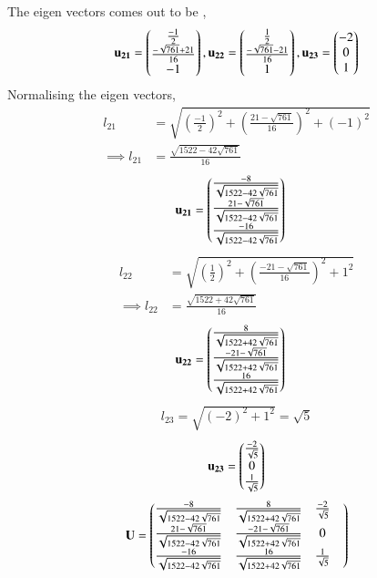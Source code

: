 \documentclass[journal,12pt,twocolumn]{IEEEtran}
\begin{document}
The eigen vectors comes out to be , 
\begin{align}
    \mathbf{u_{21}}=\begin{pmatrix}\frac{-1}{2}\\\frac{-\sqrt{761}+21}{16}\\-1\end{pmatrix},
    \mathbf{u_{22}}=\begin{pmatrix}\frac{1}{2}\\\frac{-\sqrt{761}-21}{16}\\1\end{pmatrix},
    \mathbf{u_{23}}=\begin{pmatrix}-2 \\ 0 \\ 1\end{pmatrix}
\end{align}
Normalising the eigen vectors, 
\begin{align}
    l_{21}&=\sqrt{\left(\frac{-1}{2}\right)^2+\left(\frac{21-\sqrt{761}}{16}\right)^2+(-1)^2}\\
    \implies l_{21}&=\frac{\sqrt{1522-42\sqrt{761}}}{16}
\end{align}
\begin{align}
    \mathbf{u_{21}}&=\begin{pmatrix}\frac{-8}{\sqrt{1522-42\sqrt{761}}}\\\frac{21-\sqrt{761}}{\sqrt{1522-42\sqrt{761}}}\\\frac{-16}{\sqrt{1522-42\sqrt{761}}}\end{pmatrix}
\end{align}
\begin{align}
    l_{22}&=\sqrt{\left(\frac{1}{2}\right)^2+\left(\frac{-21-\sqrt{761}}{16}\right)^2+1^2}\\
    \implies l_{22}&=\frac{\sqrt{1522+42\sqrt{761}}}{16}
\end{align}
\begin{align}
    \mathbf{u_{22}}&=\begin{pmatrix}\frac{8}{\sqrt{1522+42\sqrt{761}}}\\\frac{-21-\sqrt{761}}{\sqrt{1522+42\sqrt{761}}}\\\frac{16}{\sqrt{1522+42\sqrt{761}}}\end{pmatrix}
\end{align}
\begin{align}
    l_{23}=\sqrt{(-2)^2+1^2}=\sqrt{5}
\end{align}
\begin{align}
    \mathbf{u_{23}}=\begin{pmatrix}\frac{-2}{\sqrt{5}}\\0\\\frac{1}{\sqrt{5}}\end{pmatrix}
\end{align}
\begin{align}
    \mathbf{U}=\begin{pmatrix}\frac{-8}{\sqrt{1522-42\sqrt{761}}} & \frac{8}{\sqrt{1522+42\sqrt{761}}}&\frac{-2}{\sqrt{5}} &\\ \frac{21-\sqrt{761}}{\sqrt{1522-42\sqrt{761}}} & \frac{-21-\sqrt{761}}{\sqrt{1522+42\sqrt{761}}}&  0 \\
   \frac{-16}{\sqrt{1522-42\sqrt{761}}} & \frac{16}{\sqrt{1522+42\sqrt{761}}} &   \frac{1}{\sqrt{5}}\end{pmatrix}
\end{align}
\end{document}
